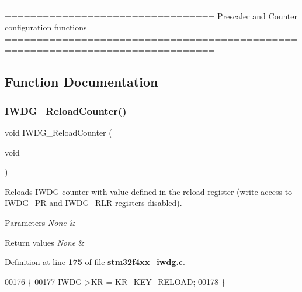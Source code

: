 \begin{DoxyVerb} ===============================================================================
                  Prescaler and Counter configuration functions
 ===============================================================================  \end{DoxyVerb}
 

\subsection{Function Documentation}
\mbox{\label{group__IWDG__Group1_ga7147ebabdc3fef97f532b171a4e70d49}} 
\subsubsection{I\+W\+D\+G\+\_\+\+Reload\+Counter()}
{\footnotesize\ttfamily void I\+W\+D\+G\+\_\+\+Reload\+Counter (\begin{DoxyParamCaption}\item[{void}]{ }\end{DoxyParamCaption})}



Reloads I\+W\+DG counter with value defined in the reload register (write access to I\+W\+D\+G\+\_\+\+PR and I\+W\+D\+G\+\_\+\+R\+LR registers disabled). 


\begin{DoxyParams}{Parameters}
{\em None} & \\
\hline
\end{DoxyParams}

\begin{DoxyRetVals}{Return values}
{\em None} & \\
\hline
\end{DoxyRetVals}


Definition at line \textbf{ 175} of file \textbf{ stm32f4xx\+\_\+iwdg.\+c}.


\begin{DoxyCode}
00176 \{
00177   IWDG->KR = KR_KEY_RELOAD;
00178 \}
\end{DoxyCode}
\mbox{\label{group__IWDG__Group1_ga4fa7f1cd690533a35ad9e4729c0450a3}} 

